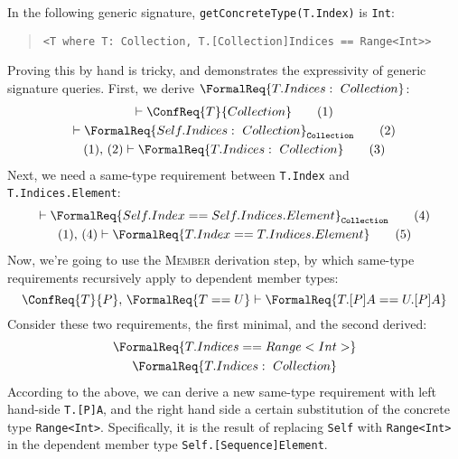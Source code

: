\documentclass[../generics]{subfiles}
\begin{document}
\begin{example}\label{concrete type query example}
In the following generic signature, \texttt{getConcreteType(T.Index)} is \texttt{Int}:
\begin{quote}
\begin{verbatim}
<T where T: Collection, T.[Collection]Indices == Range<Int>>
\end{verbatim}
\end{quote}
Proving this by hand is tricky, and demonstrates the expressivity of generic signature queries. First, we derive $\FormalReq{T.Indices:~Collection}$:
\begin{gather}
\vdash \ConfReq{T}{Collection}\tag{1}\\
\vdash \FormalReq{Self.Indices:~Collection}_\texttt{Collection}\tag{2}\\
(1),\,(2)\vdash\FormalReq{T.Indices:~Collection}\tag{3}
\end{gather}
Next, we need a same-type requirement between \texttt{T.Index} and \texttt{T.Indices.Element}:
\begin{gather}
\vdash \FormalReq{Self.Index == Self.Indices.Element}_\texttt{Collection}\tag{4}\\
(1),\,(4)\vdash \FormalReq{T.Index == T.Indices.Element}\tag{5}
\end{gather}
Now, we're going to use the \textsc{Member} derivation step, by which same-type requirements recursively apply to dependent member types:
\[\ConfReq{T}{P},\,\FormalReq{T == U}\vdash\FormalReq{T.[P]A == U.[P]A}\]
Consider these two requirements, the first minimal, and the second derived:
\begin{gather*}
\FormalReq{T.Indices == Range<Int>}\\
\FormalReq{T.Indices:~Collection}
\end{gather*}
According to the above, we can derive a new same-type requirement with left hand-side \texttt{T.[P]A}, and the right hand side a certain substitution of the concrete type \texttt{Range<Int>}. Specifically, it is the result of replacing \texttt{Self} with \texttt{Range<Int>} in the dependent member type \texttt{Self.[Sequence]Element}.


\end{example}
\end{document}
